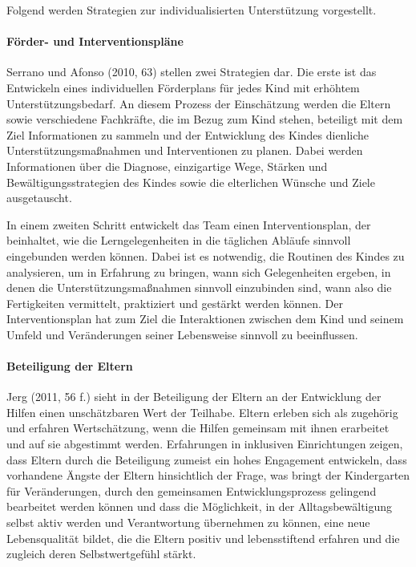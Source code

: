 Folgend werden Strategien zur individualisierten Unterstützung vorgestellt.
 
\paragraph{Förder- und Interventionspläne}\label{Forderplane} 
Serrano und Afonso (2010, 63) stellen zwei Strategien dar. Die erste ist das Entwickeln eines individuellen Förderplans für jedes Kind mit erhöhtem Unterstützungsbedarf. An diesem Prozess der Einschätzung werden die Eltern sowie verschiedene Fachkräfte, die im Bezug zum Kind stehen, beteiligt mit dem Ziel Informationen zu sammeln und der Entwicklung des Kindes dienliche Unterstützungsmaßnahmen und Interventionen zu planen. Dabei werden Informationen über die Diagnose, einzigartige Wege, Stärken und Bewältigungsstrategien des Kindes sowie die elterlichen Wünsche und Ziele ausgetauscht. 

In einem zweiten Schritt entwickelt das Team einen Interventionsplan, der beinhaltet, wie die Lerngelegenheiten in die täglichen Abläufe sinnvoll eingebunden werden können. Dabei ist es notwendig, die Routinen des Kindes zu analysieren, um in Erfahrung zu bringen, wann sich Gelegenheiten ergeben, in denen die Unterstützungsmaßnahmen sinnvoll einzubinden sind, wann also die Fertigkeiten vermittelt, praktiziert und gestärkt werden können. Der Interventionsplan hat zum Ziel die Interaktionen zwischen dem Kind und seinem Umfeld und Veränderungen seiner Lebensweise sinnvoll zu beeinflussen.  

\paragraph{Beteiligung der Eltern} Jerg (2011, 56 f.) sieht in der Beteiligung der Eltern an der Entwicklung der Hilfen einen unschätzbaren Wert der Teilhabe. Eltern erleben sich als zugehörig und erfahren Wertschätzung, wenn die Hilfen gemeinsam mit ihnen erarbeitet und auf sie abgestimmt werden. Erfahrungen in inklusiven Einrichtungen zeigen, dass Eltern durch die Beteiligung zumeist ein hohes Engagement entwickeln, dass vorhandene Ängste der Eltern hinsichtlich der Frage, was bringt der Kindergarten für Veränderungen, durch den gemeinsamen Entwicklungsprozess gelingend bearbeitet werden können und dass die Möglichkeit, in der Alltagsbewältigung selbst aktiv werden und Verantwortung übernehmen zu können, eine neue Lebensqualität bildet, die die Eltern positiv und lebensstiftend erfahren und die zugleich deren Selbstwertgefühl stärkt.     

